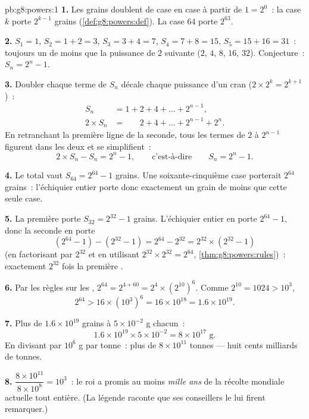 \begin{solution}{pb:g8:powers:1}
\textbf{1.} Les grains doublent de case en case à partir de
$1 = 2^0$~: la case $k$ porte $2^{k-1}$ grains
(\cref{def:g8:powers:def}). La case $64$ porte $2^{63}$.

\textbf{2.} $S_1 = 1$, $S_2 = 1 + 2 = 3$, $S_3 = 3 + 4 = 7$,
$S_4 = 7 + 8 = 15$, $S_5 = 15 + 16 = 31$~: toujours un de moins que
la puissance de $2$ suivante ($2$, $4$, $8$, $16$, $32$).
Conjecture~: $S_n = 2^n - 1$.

\textbf{3.} Doubler chaque terme de $S_n$ décale chaque puissance
d'un cran ($2 \times 2^{k} = 2^{k+1}$)~:
\begin{align*}
S_n &= 1 + 2 + 4 + \dots + 2^{n-1}, \\
2 \times S_n &= \phantom{1 + {}} 2 + 4 + \dots + 2^{n-1} + 2^n .
\end{align*}
En retranchant la première ligne de la seconde, tous les termes de
$2$ à $2^{n-1}$ figurent dans les deux et se simplifient~:
\[
2 \times S_n - S_n = 2^n - 1,
\qquad\text{c'est-à-dire}\qquad
S_n = 2^n - 1 .
\]

\textbf{4.} Le total vaut $S_{64} = 2^{64} - 1$ grains. Une
soixante-cinquième case porterait $2^{64}$ grains~: l'échiquier
entier porte donc exactement un grain de moins que cette seule case.

\textbf{5.} La première  porte $S_{32} = 2^{32} - 1$ grains.
L'échiquier entier en porte $2^{64} - 1$, donc la seconde  en
porte
\[
\left(2^{64} - 1\right) - \left(2^{32} - 1\right)
= 2^{64} - 2^{32}
= 2^{32} \times \left(2^{32} - 1\right)
\]
(en factorisant par $2^{32}$ et en utilisant
$2^{32} \times 2^{32} = 2^{64}$, \cref{thm:g8:powers:rules})~:
exactement $2^{32}$ fois la première .

\textbf{6.} Par les règles sur les ,
$2^{64} = 2^{4 + 60} = 2^4 \times \left(2^{10}\right)^6$. Comme
$2^{10} = 1024 > 10^3$,
\[
2^{64} > 16 \times \left(10^3\right)^6 = 16 \times 10^{18}
= 1.6 \times 10^{19} .
\]

\textbf{7.} Plus de $1.6 \times 10^{19}$ grains à
$5 \times 10^{-2}$ g chacun~:
\[
1.6 \times 10^{19} \times 5 \times 10^{-2}
= 8 \times 10^{17} \text{ g} .
\]
En divisant par $10^6$ g par tonne~: plus de $8 \times 10^{11}$
tonnes --- huit cents milliards de tonnes.

\textbf{8.} $\dfrac{8 \times 10^{11}}{8 \times 10^{8}} = 10^3$~: le
roi a promis au moins \emph{mille ans} de la récolte mondiale
actuelle tout entière. (La légende raconte que ses conseillers le lui
firent remarquer.)


\end{solution}
